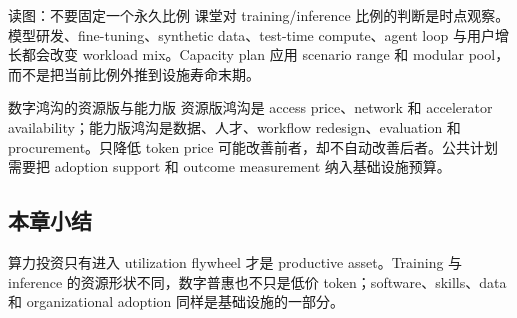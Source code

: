
\begin{knowledgebox}{读图：不要固定一个永久比例}
课堂对 training/inference 比例的判断是时点观察。模型研发、fine-tuning、synthetic data、test-time compute、agent loop 与用户增长都会改变 workload mix。Capacity plan 应用 scenario range 和 modular pool，而不是把当前比例外推到设施寿命末期。
\end{knowledgebox}

\begin{importantbox}{数字鸿沟的资源版与能力版}
资源版鸿沟是 access price、network 和 accelerator availability；能力版鸿沟是数据、人才、workflow redesign、evaluation 和 procurement。只降低 token price 可能改善前者，却不自动改善后者。公共计划需要把 adoption support 和 outcome measurement 纳入基础设施预算。
\end{importantbox}

\subsection{本章小结}

算力投资只有进入 utilization flywheel 才是 productive asset。Training 与 inference 的资源形状不同，数字普惠也不只是低价 token；software、skills、data 和 organizational adoption 同样是基础设施的一部分。


